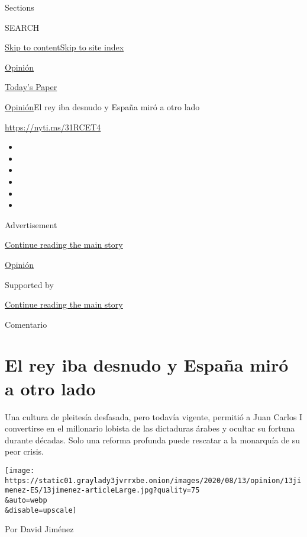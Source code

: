 Sections

SEARCH

\protect\hyperlink{site-content}{Skip to
content}\protect\hyperlink{site-index}{Skip to site index}

\href{https://www.nytimes3xbfgragh.onion/es/section/opinion}{Opinión}

\href{https://myaccount.nytimes3xbfgragh.onion/auth/login?response_type=cookie\&client_id=vi}{}

\href{https://www.nytimes3xbfgragh.onion/section/todayspaper}{Today's
Paper}

\href{/es/section/opinion}{Opinión}\textbar{}El rey iba desnudo y España
miró a otro lado

\url{https://nyti.ms/31RCET4}

\begin{itemize}
\item
\item
\item
\item
\item
\item
\end{itemize}

Advertisement

\protect\hyperlink{after-top}{Continue reading the main story}

\href{/es/section/opinion}{Opinión}

Supported by

\protect\hyperlink{after-sponsor}{Continue reading the main story}

Comentario

\hypertarget{el-rey-iba-desnudo-y-espauxf1a-miruxf3-a-otro-lado}{%
\section{El rey iba desnudo y España miró a otro
lado}\label{el-rey-iba-desnudo-y-espauxf1a-miruxf3-a-otro-lado}}

Una cultura de pleitesía desfasada, pero todavía vigente, permitió a
Juan Carlos I convertirse en el millonario lobista de las dictaduras
árabes y ocultar su fortuna durante décadas. Solo una reforma profunda
puede rescatar a la monarquía de su peor crisis.

\texttt{[image: https://static01.graylady3jvrrxbe.onion/images/2020/08/13/opinion/13jimenez-ES/13jimenez-articleLarge.jpg?quality=75\\\&auto=webp\\\&disable=upscale]}

Por David Jiménez

